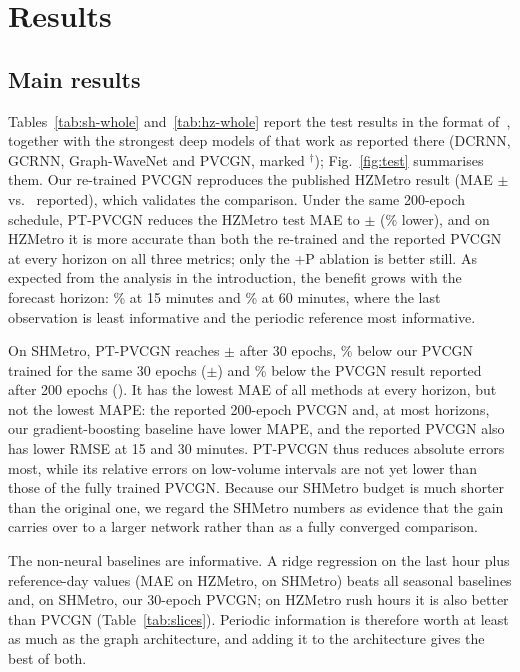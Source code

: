 \documentclass[journal]{IEEEtran}
\begin{document}
\section{Results}
\subsection{Main results}
Tables~\ref{tab:sh-whole} and~\ref{tab:hz-whole} report the test results in the format of~\cite{liu2022pvcgn}, together with the strongest deep models of that work as reported there (DCRNN, GCRNN, Graph-WaveNet and PVCGN, marked $^\dagger$); Fig.~\ref{fig:test} summarises them. Our re-trained PVCGN reproduces the published HZMetro result (MAE \hzPV$\pm$\hzPVstd{} vs.\ \hzPVpaper{} reported), which validates the comparison. Under the same 200-epoch schedule, PT-PVCGN reduces the HZMetro test MAE to \hzPT$\pm$\hzPTstd{} (\hzGain\% lower), and on HZMetro it is more accurate than both the re-trained and the reported PVCGN at every horizon on all three metrics; only the +P ablation is better still. As expected from the analysis in the introduction, the benefit grows with the forecast horizon: \hzGainFifteen\% at 15 minutes and \hzGainSixty\% at 60 minutes, where the last observation is least informative and the periodic reference most informative.

On SHMetro, PT-PVCGN reaches \shPT$\pm$\shPTstd{} after 30 epochs, \shGain\% below our PVCGN trained for the same 30 epochs (\shPV$\pm$\shPVstd) and \shGainPaper\% below the PVCGN result reported after 200 epochs (\shPVpaper). It has the lowest MAE of all methods at every horizon, but not the lowest MAPE: the reported 200-epoch PVCGN and, at most horizons, our gradient-boosting baseline have lower MAPE, and the reported PVCGN also has lower RMSE at 15 and 30 minutes. PT-PVCGN thus reduces absolute errors most, while its relative errors on low-volume intervals are not yet lower than those of the fully trained PVCGN. Because our SHMetro budget is much shorter than the original one, we regard the SHMetro numbers as evidence that the gain carries over to a larger network rather than as a fully converged comparison.

The non-neural baselines are informative. A ridge regression on the last hour plus reference-day values (MAE \hzRidge{} on HZMetro, \shRidge{} on SHMetro) beats all seasonal baselines and, on SHMetro, our 30-epoch PVCGN; on HZMetro rush hours it is also better than PVCGN (Table~\ref{tab:slices}). Periodic information is therefore worth at least as much as the graph architecture, and adding it to the architecture gives the best of both.
\end{document}
